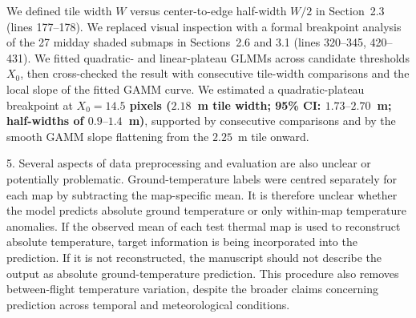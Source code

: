 \documentclass[12pt,english]{reviewresponse}
\begin{document}
\begin{revresponse}
We defined tile width $W$ versus center-to-edge half-width $W/2$ in Section~2.3 (lines 177--178). We replaced visual inspection with a formal breakpoint analysis of the 27 midday shaded submaps in Sections~2.6 and 3.1 (lines 320--345, 420--431). We fitted quadratic- and linear-plateau GLMMs across candidate thresholds $X_0$, then cross-checked the result with consecutive tile-width comparisons and the local slope of the fitted GAMM curve. We estimated a quadratic-plateau breakpoint at \textbf{$X_0 = 14.5$ pixels ($2.18$~m tile width; 95\% CI: $1.73\text{--}2.70$~m; half-widths of $0.9\text{--}1.4$~m)}, supported by consecutive comparisons and by the smooth GAMM slope flattening from the $2.25$~m tile onward.
\end{revresponse}

\begin{revcomment}
5. Several aspects of data preprocessing and evaluation are also unclear or potentially problematic. Ground-temperature labels were centred separately for each map by subtracting the map-specific mean. It is therefore unclear whether the model predicts absolute ground temperature or only within-map temperature anomalies. If the observed mean of each test thermal map is used to reconstruct absolute temperature, target information is being incorporated into the prediction. If it is not reconstructed, the manuscript should not describe the output as absolute ground-temperature prediction. This procedure also removes between-flight temperature variation, despite the broader claims concerning prediction across temporal and meteorological conditions.
\end{revcomment}
\end{document}
